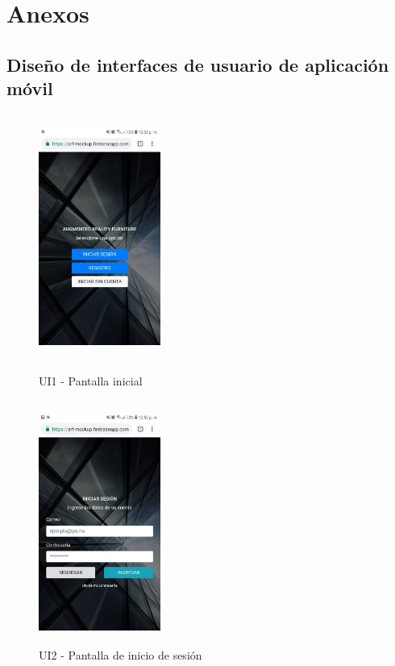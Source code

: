 \chapter{Anexos}
\section{Diseño de interfaces de usuario de aplicación móvil}
\begin{figure}[h!]
	\begin{minipage}{0.48\textwidth}
		\centering
		\includegraphics[width=4cm,height=8cm]{imagenes/Anexos/Mockup/main.jpg}
		\caption{UI1 - Pantalla inicial}
		\label{fig:main}
	\end{minipage}\hfill
	\begin{minipage}{0.48\textwidth}
		\centering
		\includegraphics[width=4cm,height=8cm]{imagenes/Anexos/Mockup/login.jpg}
		\caption{UI2 - Pantalla de inicio de sesión}
		\label{fig:login}
	\end{minipage}\hfill
\end{figure}

